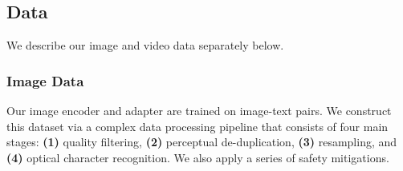 \subsection{Data}
\label{section:vision_data}
We describe our image and video data separately below.

\subsubsection{Image Data}
\label{subsubsection:vision_data_image}
Our image encoder and adapter are trained on image-text pairs.  %
We construct this dataset via a complex data processing pipeline that consists of four main stages: \textbf{(1)} quality filtering, \textbf{(2)} perceptual de-duplication, \textbf{(3)} resampling, and \textbf{(4)} optical character recognition.
We also apply a series of safety mitigations.

